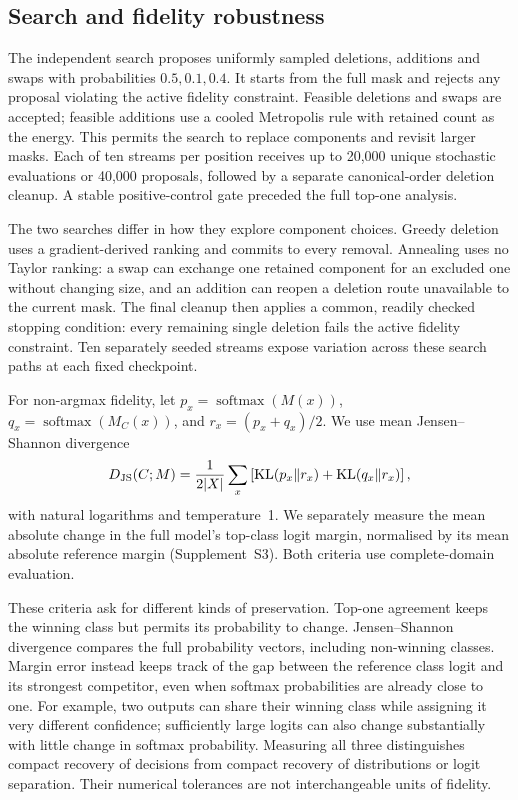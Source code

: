 \subsection{Search and fidelity robustness}

The independent search proposes uniformly sampled deletions, additions and swaps with probabilities $0.5,0.1,0.4$. It starts from the full mask and rejects any proposal violating the active fidelity constraint. Feasible deletions and swaps are accepted; feasible additions use a cooled Metropolis rule with retained count as the energy. This permits the search to replace components and revisit larger masks. Each of ten streams per position receives up to 20,000 unique stochastic evaluations or 40,000 proposals, followed by a separate canonical-order deletion cleanup. A stable positive-control gate preceded the full top-one analysis.

The two searches differ in how they explore component choices. Greedy deletion uses a gradient-derived ranking and commits to every removal. Annealing uses no Taylor ranking: a swap can exchange one retained component for an excluded one without changing size, and an addition can reopen a deletion route unavailable to the current mask. The final cleanup then applies a common, readily checked stopping condition: every remaining single deletion fails the active fidelity constraint. Ten separately seeded streams expose variation across these search paths at each fixed checkpoint.

For non-argmax fidelity, let $p_x=\operatorname{softmax}(M(x))$, $q_x=\operatorname{softmax}(M_C(x))$, and $r_x=(p_x+q_x)/2$. We use mean Jensen--Shannon divergence
\begin{equation}
 D_{\mathrm{JS}}(C;M)=\frac{1}{2|X|}\sum_x
 \left[\operatorname{KL}(p_x\|r_x)+\operatorname{KL}(q_x\|r_x)\right],
 \label{eq:js}
\end{equation}
with natural logarithms and temperature~1. We separately measure the mean absolute change in the full model's top-class logit margin, normalised by its mean absolute reference margin (Supplement~S3). Both criteria use complete-domain evaluation.

These criteria ask for different kinds of preservation. Top-one agreement keeps the winning class but permits its probability to change. Jensen--Shannon divergence compares the full probability vectors, including non-winning classes. Margin error instead keeps track of the gap between the reference class logit and its strongest competitor, even when softmax probabilities are already close to one. For example, two outputs can share their winning class while assigning it very different confidence; sufficiently large logits can also change substantially with little change in softmax probability. Measuring all three distinguishes compact recovery of decisions from compact recovery of distributions or logit separation. Their numerical tolerances are not interchangeable units of fidelity.

